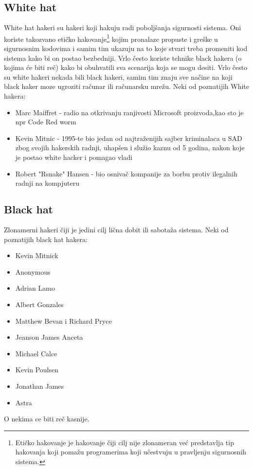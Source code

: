 \documentclass[a4paper]{article}
\begin{document}
\subsection{White hat}
\label{subsec:podnaslov1}
White hat hakeri su hakeri koji hakuju radi poboljšanja sigurnosti sistema. Oni koriste takozvano etičko hakovanje\footnote{Etičko hakovanje je hakovanje čiji cilj nije zlonameran već predstavlja tip hakovanja koji pomažu programerima koji učestvuju u pravljenju sigurnosnih sistema.} kojim pronalaze propuste i greške u sigurnosnim kodovima i samim tim ukazuju na to koje stvari treba promeniti kod sistema kako bi on postao bezbedniji. Vrlo često koriste tehnike black hakera (o kojima će biti reč) kako bi obuhvatili sva scenarija koja se mogu desiti. Vrlo često su white hakeri nekada bili black hakeri, samim tim znaju sve načine na koji black haker moze ugroziti računar ili računarsku mrežu.
\newline
\newline
Neki od poznatijih White hakera:
\begin{itemize}
	\item Marc Maiffret - radio na otkrivanju ranjivosti Microsoft proizvoda,kao sto je npr Code Red worm
	\item Kevin Mitnic - 1995-te bio jedan od najtraženijih sajber kriminalaca u SAD zbog svojih hakerskih radnji, uhapšen i služio kaznu od 5 godina, nakon koje je postao white hacker i pomagao vladi
	\item Robert "Rsnake" Hansen - bio osnivač kompanije za borbu protiv ilegalnih radnji na kompjuteru
\end{itemize}
\subsection{Black hat}
\label{subsec:podnaslov2}
Zlonamerni hakeri čiji je jedini cilj lična dobit ili sabotaža sistema.
\newline
Neki od poznatijih black hat hakera:
\begin{itemize}
	\item Kevin Mitnick
	\item Anonymous
	\item Adrian Lamo
	\item Albert Gonzales
	\item Matthew Bevan i Richard Pryce
	\item Jeanson James Anceta
	\item Michael Calce
	\item Kevin Poulsen
	\item Jonathan James
	\item Astra
\end{itemize}
O nekima ce biti reč kasnije.
\end{document}
